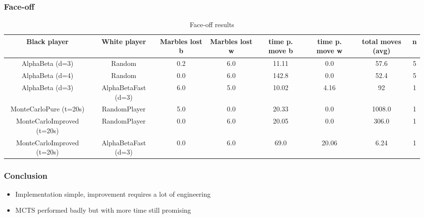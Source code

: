\documentclass{beamer}
\begin{document}
\begin{frame}
	\frametitle{Face-off}
	\begin{table}
		\begin{center}
			\begin{tabular}{ | c | c | c | c | c | c | c | c | }
				\hline
				Black player               & White player        & \small{Marbles lost b} & \small{Marbles lost w} & \small{time p. move b} & \small{time p. move w} & \small{total moves (avg)} & n \\
				\hline
				AlphaBeta (d=3)            & Random              & 0.2                    & 6.0                    & 11.11                  & 0.0                    & 57.6                      & 5 \\
				\hline
				AlphaBeta (d=4)            & Random              & 0.0                    & 6.0                    & 142.8                  & 0.0                    & 52.4                      & 5 \\
				\hline
				AlphaBeta (d=3)            & AlphaBetaFast (d=3) & 6.0                    & 5.0                    & 10.02                  & 4.16                   & 92                        & 1 \\
				\hline
				MonteCarloPure (t=20s)     & RandomPlayer        & 5.0                    & 0.0                    & 20.33                  & 0.0                    & 1008.0                    & 1 \\
				\hline
				MonteCarloImproved (t=20s) & RandomPlayer        & 0.0                    & 6.0                    & 20.05                  & 0.0                    & 306.0                     & 1 \\
				\hline
				MonteCarloImproved (t=20s) & AlphaBetaFast (d=3) & 0.0                    & 6.0                    & 69.0                   & 20.06                  & 6.24                      & 1 \\
				\hline
			\end{tabular}
		\end{center}
		\label{node_count}
		\caption{Face-off results}
	\end{table}
\end{frame}

\begin{frame}
	\frametitle{Conclusion}
	\begin{itemize}
		\item Implementation simple, improvement requires a lot of engineering
		\item MCTS performed badly but with more time still promising
	\end{itemize}
\end{frame}
\end{document}
